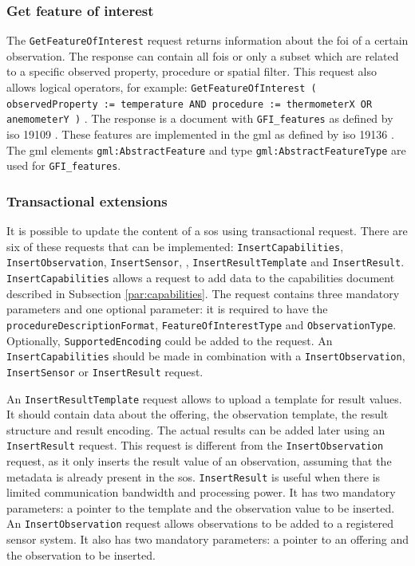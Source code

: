 
\subsubsection{Get feature of interest}
\begin{sloppypar}
	The \texttt{GetFeatureOfInterest} request returns information about the \ac{foi} of a certain observation. The response can contain all \acp{foi} or only a subset which are related to a specific observed property, procedure or spatial filter. This request also allows logical operators, for example: \texttt{GetFeatureOfInterest ( observedProperty := temperature AND procedure := thermometerX OR anemometerY )} \citep[p. 40]{SW:OGC2}. The response is a document with \texttt{GFI\_features} as defined by \ac{iso} 19109 \citep{GEO:ISO}. These features are implemented in the \ac{gml} as defined by \ac{iso} 19136 \citep{GEO:ISO2}. The \ac{gml} elements \texttt{gml:AbstractFeature} and type \texttt{gml:AbstractFeatureType} \citep[p. 38]{SW:ISO} are used for \texttt{GFI\_features}.
\end{sloppypar}

\subsubsection{Transactional extensions}
\begin{sloppypar}
It is possible to update the content of a \ac{sos} using transactional request. There are six of these requests that can be implemented: \texttt{InsertCapabilities}, \texttt{InsertObservation}, \texttt{InsertSensor}, , \texttt{InsertResultTemplate} and \texttt{InsertResult}. \texttt{InsertCapabilities} allows a request to add data to the capabilities document described in Subsection \ref{par:capabilities}. The request contains three mandatory parameters and one optional parameter: it is required to have the \texttt{procedureDescriptionFormat}, \texttt{FeatureOfInterestType} and \texttt{ObservationType}. Optionally, \texttt{SupportedEncoding} could be added to the request. An \texttt{InsertCapabilities} should be made in combination with a \texttt{InsertObservation}, \texttt{InsertSensor} or \texttt{InsertResult} request.
\end{sloppypar}

An \texttt{InsertResultTemplate} request allows to upload a template for result values. It should contain data about the offering, the observation template, the result structure and result encoding. The actual results can be added later using an \texttt{InsertResult} request. This request is different from the \texttt{InsertObservation} request, as it only inserts the result value of an observation, assuming that the metadata is already present in the \ac{sos}. \texttt{InsertResult} is useful when there is limited communication bandwidth and processing power. It has two mandatory parameters: a pointer to the template and the observation value to be inserted. An \texttt{InsertObservation} request allows observations to be added to a registered sensor system. It also has two mandatory parameters: a pointer to an offering and the observation to be inserted.


